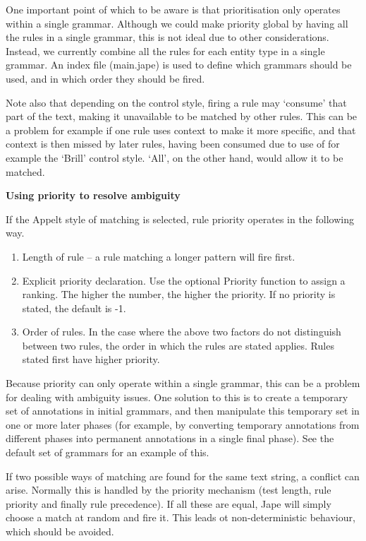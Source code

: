 One important point of which to be aware is that prioritisation only
operates within a single grammar. Although we could make priority
global by having all the rules in a single grammar, this is not ideal
due to other considerations. Instead, we currently combine all the
rules for each entity type in a single grammar. An index file
(main.jape) is used to define which grammars should be used, and in
which order they should be fired.

Note also that depending on the control style, firing a rule may `consume' that
part of the text, making it unavailable to be matched by other rules. This can
be a problem for example if one rule uses context to make it more specific, and
that context is then missed by later rules, having been consumed due to use of
for example the `Brill' control style. `All', on the other hand, would allow it
to be matched.

{\bf Using priority to resolve ambiguity}

If the Appelt style of matching is selected, rule priority operates in
the following way.
\begin{enumerate}
\item
Length of rule -- a rule matching a longer pattern will fire
first.
\item
Explicit priority declaration. Use the optional Priority function to
assign a ranking. The higher the number, the higher the priority. If
no priority is stated, the default is -1.
\item
Order of rules. In the case where the above two factors do not
distinguish between two rules, the order in which the rules are stated
applies. Rules stated first have higher priority.
\end{enumerate}

Because priority can only operate within a single grammar, this can be
a problem for dealing with ambiguity issues. One solution to this is
to create a temporary set of annotations in initial grammars, and then
manipulate this temporary set in one or more later phases (for
example, by converting temporary annotations from different phases
into permanent annotations in a single final phase). See the default
set of grammars for an example of this.

If two possible ways of matching are found for the
same text string, a conflict can arise. Normally this is handled by
the priority mechanism (test length, rule priority and finally rule
precedence). If all these are equal, Jape will simply choose a match
at random and fire it. This leads ot non-deterministic behaviour,
which should be avoided.

